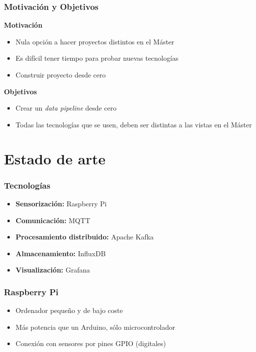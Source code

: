 \documentclass[12pt]{beamer}
\begin{document}
        \begin{frame}
            \frametitle{Motivación y Objetivos}

            \textbf{Motivación} 
            \begin{itemize}
                \item Nula opción a hacer proyectos distintos en el Máster
                \item Es difícil tener tiempo para probar nuevas tecnologías
                \item Construir proyecto desde cero
            \end{itemize}

            \textbf{Objetivos}
            \begin{itemize}
                \item Crear un \textit{data pipeline} desde cero
                \item Todas las tecnologías que se usen, deben ser distintas a las vistas en el Máster
            \end{itemize}
        \end{frame}

        \section{Estado de arte}

        \begin{frame}
            \frametitle{Tecnologías}

            \begin{itemize}
                \item \textbf{Sensorización:} Raspberry Pi
                \item \textbf{Comunicación:} MQTT
                \item \textbf{Procesamiento distribuido:} Apache Kafka
                \item \textbf{Almacenamiento:} InfluxDB
                \item \textbf{Visualización:} Grafana
            \end{itemize}
        \end{frame}

        \begin{frame}
            \frametitle{Raspberry Pi}

            \begin{itemize}
                \item Ordenador pequeño y de bajo coste
                \item Más potencia que un Arduino, sólo microcontrolador
                \item Conexión con sensores por pines GPIO (digitales)
            \end{itemize}
        \end{frame}
\end{document}
